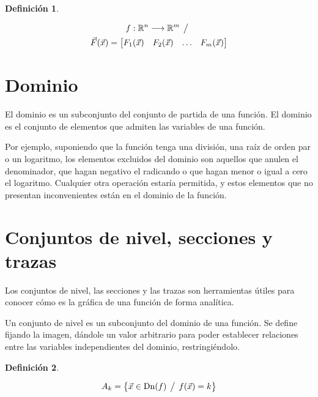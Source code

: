 \documentclass[a5paper,12pt,twoside]{book}
\newtheorem{defn}{{Definición}}[chapter]
\begin{document}
\begin{mdframed}[style=MyFrame1]
    \begin{defn}
    \end{defn}
    \begin{multline*}
        f:\mathbb{R}^n \longrightarrow \mathbb{R}^m \hspace{1ex} \big/ \hspace{1ex}
        \\
        \Vec{F}(\Vec{x}) = \begin{bmatrix} F_1(\Vec{x}) & F_2(\Vec{x}) & \dots & F_m(\Vec{x}) \end{bmatrix}
    \end{multline*}
\end{mdframed}


\section{Dominio}

El dominio es un subconjunto del conjunto de partida de una función. El dominio es el conjunto de elementos que admiten las variables de una función.

Por ejemplo, suponiendo que la función tenga una división, una raíz de orden par o un logaritmo, los elementos excluidos del dominio son aquellos que anulen el denominador, que hagan negativo el radicando o que hagan menor o igual a cero el logaritmo. Cualquier otra operación estaría permitida, y estos elementos que no presentan inconvenientes están en el dominio de la función.


\section{Conjuntos de nivel, secciones y trazas}

Los conjuntos de nivel, las secciones y las trazas son herramientas útiles para conocer cómo es la gráfica de una función de forma analítica.



Un conjunto de nivel es un subconjunto del dominio de una función. Se define fijando la imagen, dándole un valor arbitrario para poder establecer relaciones entre las variables independientes del dominio, restringiéndolo.

\begin{mdframed}[style=MyFrame1]
    \begin{defn}
    \end{defn}
    \begin{equation*}
        A_{k} = \big\{ \Vec{x} \in \operatorname{Dn}(f) \hspace{1ex} \big/ \hspace{1ex} f(\Vec{x})=k \big\}
    \end{equation*}
\end{mdframed}
\end{document}

